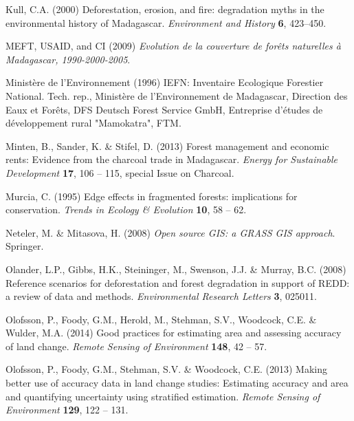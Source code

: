 \documentclass[a4paper, 12pt, leqno]{article}\usepackage[]{graphicx}\usepackage[]{color}
\begin{document}
\begin{thebibliography}{60}
Kull, C.A. (2000) {Deforestation, erosion, and fire: degradation myths in the
  environmental history of Madagascar}. \emph{Environment and History}
  \textbf{6}, 423--450.

{MEFT, USAID, and CI} (2009) \emph{{Evolution de la couverture de forêts
  naturelles à Madagascar, 1990-2000-2005}}.

{Ministère de l'Environnement} (1996) {IEFN: Inventaire Ecologique Forestier
  National}. Tech. rep., {Ministère de l'Environnement de Madagascar,
  Direction des Eaux et Forêts, DFS Deutsch Forest Service GmbH, Entreprise
  d'études de développement rural "Mamokatra", FTM}.

Minten, B., Sander, K. \& Stifel, D. (2013) {Forest management and economic
  rents: Evidence from the charcoal trade in Madagascar}. \emph{Energy for
  Sustainable Development} \textbf{17}, 106 -- 115, special Issue on Charcoal.

Murcia, C. (1995) Edge effects in fragmented forests: implications for
  conservation. \emph{Trends in Ecology \& Evolution} \textbf{10}, 58 -- 62.

Neteler, M. \& Mitasova, H. (2008) \emph{{Open source GIS: a GRASS GIS
  approach}}. Springer.

Olander, L.P., Gibbs, H.K., Steininger, M., Swenson, J.J. \& Murray, B.C.
  (2008) {Reference scenarios for deforestation and forest degradation in
  support of REDD: a review of data and methods}. \emph{Environmental Research
  Letters} \textbf{3}, 025011.

Olofsson, P., Foody, G.M., Herold, M., Stehman, S.V., Woodcock, C.E. \& Wulder,
  M.A. (2014) Good practices for estimating area and assessing accuracy of land
  change. \emph{Remote Sensing of Environment} \textbf{148}, 42 -- 57.

Olofsson, P., Foody, G.M., Stehman, S.V. \& Woodcock, C.E. (2013) Making better
  use of accuracy data in land change studies: Estimating accuracy and area and
  quantifying uncertainty using stratified estimation. \emph{Remote Sensing of
  Environment} \textbf{129}, 122 -- 131.


\end{thebibliography}
\end{document}
